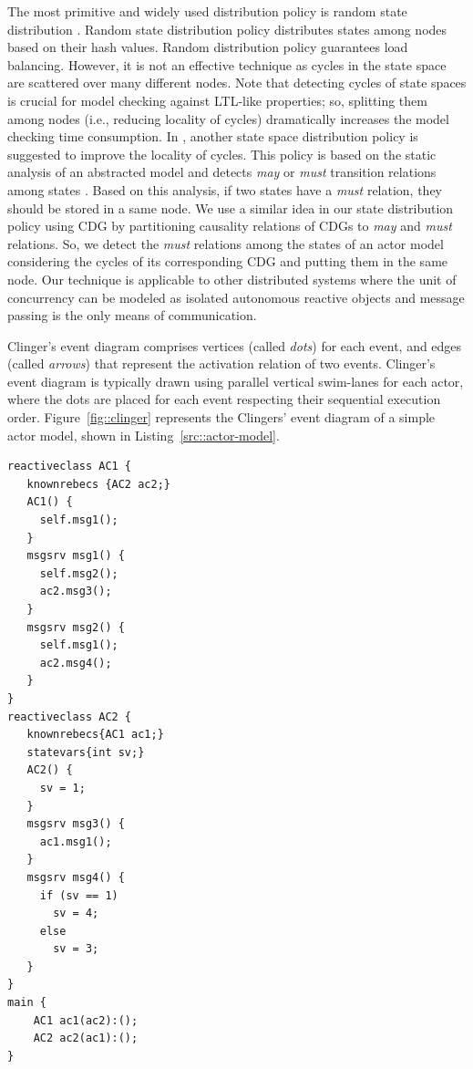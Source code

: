 The most primitive and widely used distribution policy is random state distribution \cite{DBLP:journals/entcs/GaravelMS13}. Random state distribution policy distributes states among nodes based on their hash values. Random distribution policy guarantees load balancing. However, it is not an effective technique as cycles in the state space are scattered over many different nodes. Note that detecting cycles of state spaces is crucial for model checking against LTL-like properties; so, splitting them among nodes (i.e., reducing locality of cycles) dramatically increases the model checking time consumption. In \cite{DBLP:journals/entcs/OrzanPE05}, another state space distribution policy is suggested to improve the locality of cycles. This policy is based on the static analysis of an abstracted model and detects \emph{may} or \emph{must} transition relations among states \cite{DBLP:conf/lics/LarsenT88}.
Based on this analysis, if two states have a \emph{must} relation, they should be stored in a same node. We use a similar idea in our state distribution policy using CDG by partitioning causality relations of CDGs to \emph{may} and \emph{must} relations. So, we detect the \emph{must} relations among the states of an actor model considering the cycles of its corresponding CDG and putting them in the same node. Our technique is applicable to other distributed systems where the unit of concurrency can be modeled as isolated autonomous reactive objects and message passing is the only means of communication. 

Clinger's event diagram comprises vertices (called \emph{dots}) for each event, and edges (called \emph{arrows}) that represent the activation relation of two events. Clinger's event diagram is typically drawn using parallel vertical swim-lanes for each actor, where the dots are placed for each event respecting their sequential execution order. Figure~\ref{fig::clinger} represents the Clingers' event diagram of a simple actor model, shown in Listing~\ref{src::actor-model}. 

\begin{lstlisting}[language=rebeca, caption= A simple actor model, label=src::actor-model]
reactiveclass AC1 {
   knownrebecs {AC2 ac2;}
   AC1() {
     self.msg1();
   }
   msgsrv msg1() {
     self.msg2();
     ac2.msg3();
   }
   msgsrv msg2() {
     self.msg1();
     ac2.msg4();
   }
}
reactiveclass AC2 {
   knownrebecs{AC1 ac1;}
   statevars{int sv;}
   AC2() {
     sv = 1;
   }
   msgsrv msg3() {
     ac1.msg1();
   }
   msgsrv msg4() {
     if (sv == 1)
       sv = 4;
     else
       sv = 3;
   }
}
main {
    AC1 ac1(ac2):();
    AC2 ac2(ac1):();
}
\end{lstlisting}

